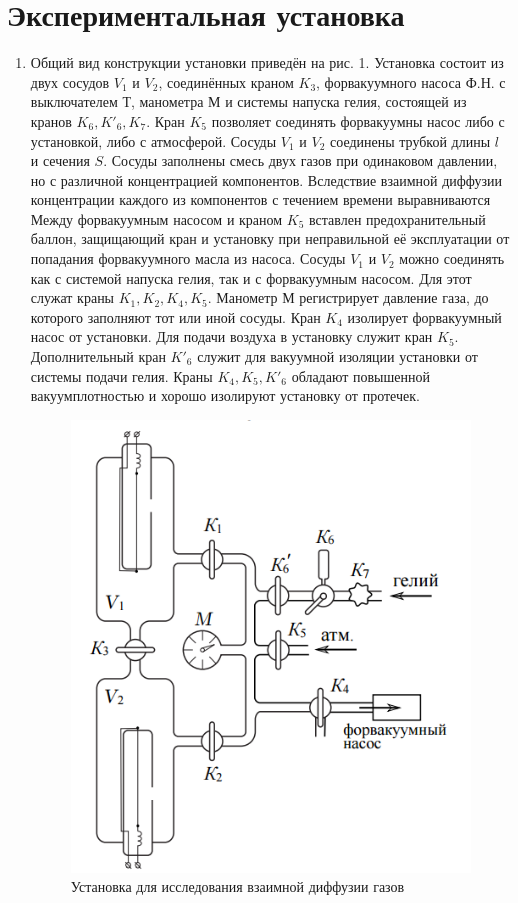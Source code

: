 \documentclass[12pt,a4paper]{article}
\begin{document}
\section{Экспериментальная установка}

\begin{enumerate}
\item Общий вид конструкции установки приведён на рис. 1. Установка состоит из двух сосудов $V_1$ и $V_2$, соединённых краном $K_3$, форвакуумного насоса Ф.Н. с выключателем Т, манометра М и системы напуска гелия, состоящей из кранов $K_6, K'_6, K_7$. Кран $K_5$ позволяет соединять форвакуумны насос либо с установкой, либо с атмосферой. Сосуды $V_1$ и $V_2$ соединены трубкой длины $l$ и сечения $S$. Сосуды заполнены смесь двух газов при одинаковом давлении, но с различной концентрацией компонентов. Вследствие взаимной диффузии концентрации каждого из компонентов с течением времени выравниваются Между форвакуумным насосом и краном $K_5$ вставлен предохранительный баллон, защищающий кран и установку при неправильной её эксплуатации от попадания форвакуумного масла из насоса. Сосуды $V_1$ и $V_2$ можно соединять как с системой напуска гелия, так и с форвакуумным насосом. Для этот служат краны $K_1, K_2, K_4, K_5$. Манометр М регистрирует давление газа, до которого заполняют тот или иной сосуды. Кран $K_4$ изолирует форвакуумный насос от установки. Для подачи воздуха в установку служит кран $K_5$. Дополнительный кран $K'_6$ служит для вакуумной изоляции установки от системы подачи гелия. Краны $K_4, K_5, K'_6$ обладают повышенной вакуумплотностью и хорошо изолируют установку от протечек.

\begin{figure}[h]
    \centering
    \includegraphics[width=7.5 cm]{facility.PNG}
    \caption{Установка для исследования взаимной диффузии газов}
    \label{fig:vac}
\end{figure}


\end{enumerate}
\end{document}

